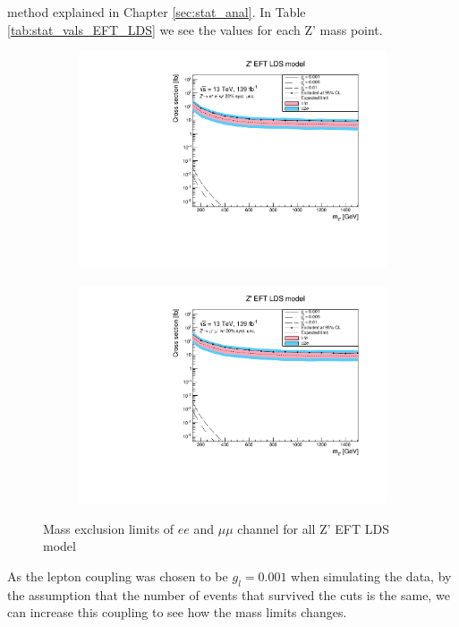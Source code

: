 \documentclass[14pt, a4paper]{book}
\begin{document}
method explained in Chapter \ref{sec:stat_anal}. In Table \ref{tab:stat_vals_EFT_LDS} we see the values for each Z' mass point.
\begin{figure}[!ht]
	\centering
   \begin{subfigure}[b]{0.49\textwidth}
      \centering
      \includegraphics[width=1\textwidth]{Limits/EFT_LDS/mass_exclusion_ee.pdf}
      \end{subfigure}
   \hfill
   \begin{subfigure}[b]{0.49\textwidth}
      \centering
      \includegraphics[width=1\textwidth]{Limits/EFT_LDS/mass_exclusion_uu.pdf}
      \end{subfigure}
   \caption{Mass exclusion limits of $ee$ and $\mu\mu$ channel for all Z' EFT LDS model}\label{fig:EFT_LDS_exclusion_ee_uu}
\end{figure}
As the lepton coupling was chosen to be $g_l=0.001$ when simulating the data, by the assumption that the number of events that survived the cuts is the same, we can increase this coupling to see how the mass limits changes.
\end{document}
